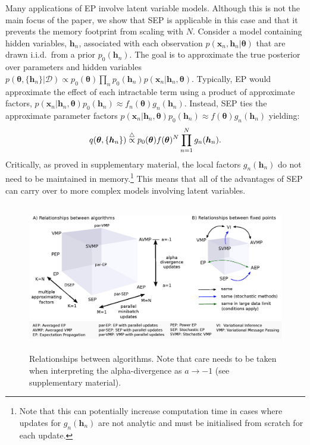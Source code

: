 Many applications of EP involve latent variable models. Although this is not the main focus of the paper, we show that SEP is applicable in this case and that it prevents the memory footprint from scaling with $N$. 
%
Consider a model containing hidden variables, $\bm{h}_n$, associated with each observation $p(\bm{x}_n, \bm{h}_n | \bm{\theta})$  that are drawn i.i.d.~from a prior $p_0(\bm{h}_n)$. The goal is to approximate the true posterior over parameters and hidden variables $p(\bm{\theta}, \{ \bm{h}_n\} | \mathcal{D}) \propto p_0(\bm{\theta}) \prod_n p_0(\bm{h}_n) p(\bm{x}_n | \bm{h}_n, \bm{\theta})$. 
%
Typically, EP would approximate the effect of each intractable term using a product of approximate factors, $p(\bm{x}_n | \bm{h}_n, \bm{\theta})p_0(\bm{h}_n)  \approx f_n(\bm{\theta}) g_n(\bm{h}_n) $. Instead, SEP ties the approximate parameter factors $p(\bm{x}_n | \bm{h}_n, \bm{\theta})p_0(\bm{h}_n)  \approx f(\bm{\theta}) g_n(\bm{h}_n) $ yielding:
\begin{equation}
q(\bm{\theta}, \{ \bm{h}_n\}) \buildrel\triangle\over \propto p_0(\bm{\theta}) f(\bm{\theta})^N \prod_{n=1}^N g_n(\bm{h}_n) .
\end{equation}
%
Critically, as proved in supplementary material, the local factors $g_n(\bm{h}_n)$ do not need to be maintained in memory.\footnote{Note that this can potentially increase computation time in cases where updates for $g_n(\bm{h}_n)$  are not analytic and must be initialised from scratch for each update.} This means that all of the advantages of SEP can carry over to more complex models involving latent variables.

\begin{figure}
\centering
\def\svgwidth{1\linewidth}
\includegraphics[height=6.5cm]{fig/relationship-algorithms.eps}%
\caption{Relationships between algorithms. Note that care needs to be taken when interpreting the alpha-divergence as $a \rightarrow -1$ (see supplementary material).}
\label{fig:relationship-algorithms}
\end{figure}